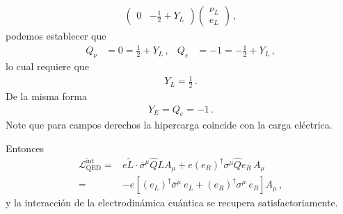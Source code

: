 \begin{frame}
\begin{align}
\begin{pmatrix}
    0  & -\frac{1}{2}+Y_L
  \end{pmatrix}  \begin{pmatrix}
    \nu_L\\
    e_L
  \end{pmatrix} \,,
\end{align}
podemos establecer que
\begin{align}
  Q_{\nu}&=0=\frac{1}{2}+Y_L\,, & Q_e&=-1=-\frac{1}{2}+Y_L\,,
\end{align}
lo cual  requiere que
\begin{align}
  Y_L=\frac{1}{2}\,.
\end{align}
De la misma forma
\begin{align}
  Y_E=Q_e=-1\,.
\end{align}
Note que para campos derechos la hipercarga coincide con la carga eléctrica.

Entonces
\begin{align}
     \mathcal{L}^{\text{int}}_{\text{QED}}=&e \widetilde{L}\cdot\overline{\sigma}^\mu \widehat{Q} L A_\mu+
e \left( e_R \right)^{\dagger}{\sigma}^\mu \widehat{Q} e_R\, A_\mu \nonumber\\
=&-e \left[ \left( e_L \right)^{\dagger}\overline{\sigma}^\mu \ e_L + \left( e_R \right)^{\dagger}{\sigma}^\mu \ e_R  \right]A_{\mu}\,,
\end{align}
y la interacción de la electrodinámica cuántica se recupera satisfactoriamente.


\end{frame}
